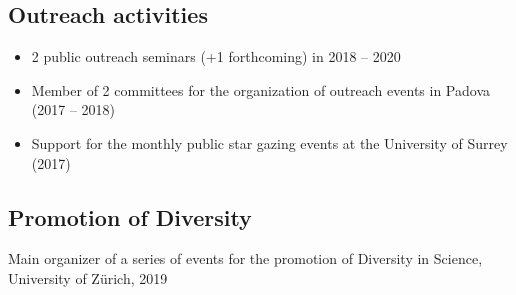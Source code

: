\documentclass[11pt,a4paper]{article}
\begin{document}
\subsection*{{Outreach activities}}
\begin{itemize}[leftmargin=3.5mm]
\setlength\itemsep{-2pt}

\item 2 public outreach seminars (+1 forthcoming) in 2018 -- 2020

\item Member of 2 committees for the organization of outreach events in Padova (2017 -- 2018)

\item Support for the monthly public star gazing events at the University of Surrey (2017)
\end{itemize}


\subsection*{{Promotion of Diversity}}

Main organizer of a series of events for the {promotion of Diversity in Science}, University of Z\"urich, 2019
\end{document}
